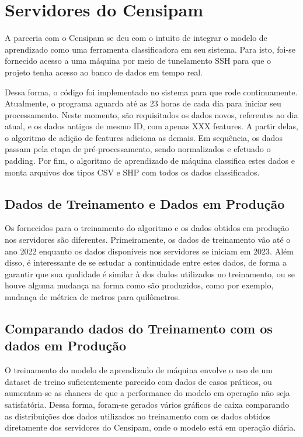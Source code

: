 \section{Servidores do Censipam}

A parceria com o Censipam se deu com o intuito de integrar o modelo de aprendizado como uma ferramenta classificadora em seu sistema. Para isto, foi-se fornecido acesso a uma máquina por meio de tunelamento SSH para que o projeto tenha acesso ao banco de  dados em tempo real.

Dessa forma, o código foi implementado no sistema para que rode continuamente. Atualmente, o programa aguarda até as 23 horas de cada dia para iniciar seu processamento. Neste momento, são requisitados os dados novos, referentes ao dia atual, e os dados antigos de mesmo ID, com apenas XXX features. A partir delas, o algoritmo de adição de features adiciona as demais. Em sequência, os dados passam pela etapa de pré-processamento, sendo normalizados e efetuado o padding. Por fim, o algoritmo de aprendizado de máquina classifica estes dados e monta arquivos dos tipos CSV e SHP com todos os dados classificados.

\subsection{Dados de Treinamento e Dados em Produção}
Os fornecidos para o treinamento do algoritmo e os dados obtidos em produção nos servidores são diferentes. Primeiramente, os dados de treinamento vão até o ano 2022 enquanto os dados disponíveis nos servidores se iniciam em 2023. Além disso, é interessante de se estudar a continuidade entre estes dados, de forma a garantir que sua qualidade é similar à dos dados utilizados no treinamento, ou se houve alguma mudança na forma como são produzidos, como por exemplo, mudança de métrica de metros para quilômetros.


\subsection{Comparando dados do Treinamento com os dados em Produção}

O treinamento do modelo de aprendizado de máquina envolve o uso de um dataset de treino suficientemente parecido com dados de casos práticos, ou aumentam-se as chances de que a performance do modelo em operação não seja satisfatória. Dessa forma, foram-se gerados vários gráficos de caixa comparando as distribuições dos dados utilizados no treinamento com os dados obtidos diretamente dos servidores do Censipam, onde o modelo está em operação diária.

